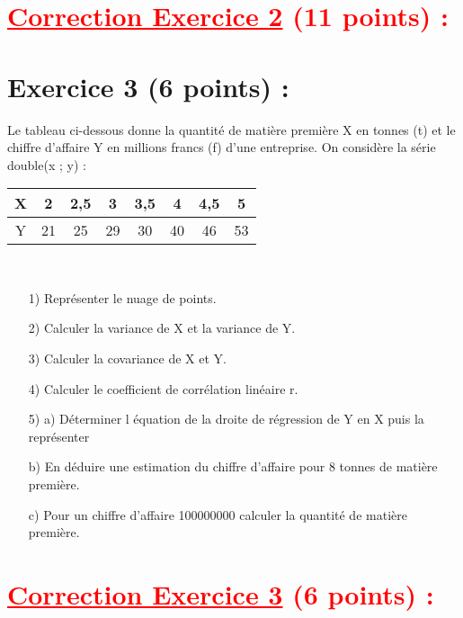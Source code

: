 \documentclass[12pt]{article}
\begin{document}
\section*{\textcolor{red}{\underline{Correction Exercice 2} (11 points) :}}
\section*{Exercice 3 (6 points) :}
Le tableau ci-dessous  donne la quantité de matière première X en tonnes (t) et le chiffre d’affaire Y en millions francs (f) d’une entreprise. On considère  la série double(x ; y) :

\begin{tabular}{|c|c|c|c|c|c|c|c|}
\hline
X & 2 & 2,5 & 3 & 3,5 & 4 & 4,5 & 5 \\
\hline
Y & 21 & 25 & 29 & 30 & 40 & 46 & 53\\
\hline
\end{tabular}\\
\begin{itemize}
\item[1)] Représenter le nuage de points.\\
\item[2)] Calculer la variance de X et la variance de Y.\\
\item[3)]  Calculer la covariance de X et Y.\\
\item[4)] Calculer le coefficient de corrélation linéaire r.\\
\item[5)] a)  Déterminer l équation de la droite de régression de Y en X puis la représenter\\
\item[b)]  En déduire une estimation du chiffre d’affaire pour 8 tonnes de matière première.\\
\item[c)]  Pour un chiffre d’affaire 100000000 calculer la quantité de matière première.
\end{itemize}
\section*{\textcolor{red}{\underline{Correction Exercice 3} (6 points) :}}
\end{document}
